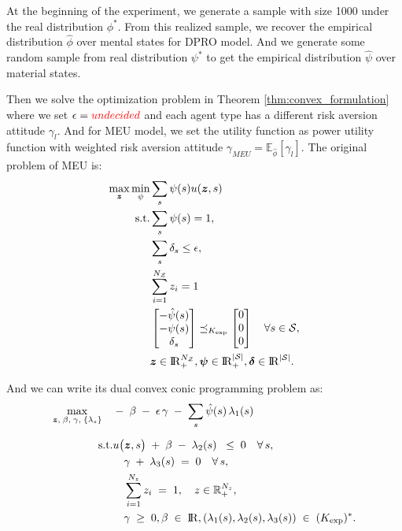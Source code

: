 \documentclass[11pt,oneside]{article}
\theoremstyle{plain}
\theoremstyle{plain}
\theoremstyle{plain}
\theoremstyle{plain}
\theoremstyle{plain}
\theoremstyle{definition}
\theoremstyle{definition}
\theoremstyle{remark}
\theoremstyle{plain}
\newcommand{\R}{{\rm I\!R}}
\def\bbe{{\mathbb{E}}}
\renewcommand{\Re}{\R}
\renewcommand{\Re}{\R}
\newcommand{\mcs}{{\cal S}}
\newcommand{\bb}[1]{{\color{red} #1     }}
\begin{document}
At the beginning of the experiment, we generate a sample with size 1000 under the real distribution $\phi^*$. From this realized sample, we recover the empirical distribution 
$\hat{\phi}$ over mental states for DPRO model. And we generate some random sample from real distribution $\psi^*$ to get the empirical distribution $\hat{\psi}$ over material states.

Then we solve the optimization problem in Theorem \ref{thm:convex_formulation} where we set $\epsilon = \bb{undecided}$ and each agent type has a different risk aversion attitude $\gamma_l$.
And for MEU model, we set the utility function as power utility function with weighted risk aversion attitude $\gamma_{MEU} = \bbe_{\hat{\phi}}[\gamma_l]$. The original problem of MEU is:
\begin{align*}
    \max_{\boldsymbol{z}} \min_{\psi} & \sum_{s} \psi(s) u(\boldsymbol{z},s) \\
    \text{s.t.} & \sum_{s} \psi(s) = 1, \\
    & \sum_{s} \delta_{s} \leq \epsilon, \\
    & \sum_{i=1} ^{N_\mathcal{Z}} z_i =1 \\
    & \begin{bmatrix}
        -\hat{\psi}(s) \\
        -\psi(s) \\
        \delta_{s}
    \end{bmatrix} \preceq_{K_{\text{exp}}} \begin{bmatrix}
        0 \\
        0 \\
        0
    \end{bmatrix} \quad \forall s\in \mcs,\\
    & \boldsymbol{z} \in \R^{N_\mathcal{Z}}_+, \boldsymbol{\psi} \in \R_+^{ |\mcs|}, \boldsymbol{\delta}\in \Re^{ |\mcs|}.
\end{align*}

And we can write its dual convex conic programming problem as:
\begin{align*}
    \max_{\boldsymbol{z},\;\beta,\;\gamma,\;\{\lambda_s\}}\quad &
    -\;\beta\;-\;\epsilon\,\gamma
    \;-\;\sum_{s}\hat{\psi}(s)\,\lambda_{1}(s)
    \\[6pt]
    \text{s.t.} & u\bigl(\boldsymbol{z},s\bigr)\;+\;\beta\;-\;\lambda_{2}(s)\;\;\le\;0
    \quad\forall\,s,\\
    &\quad \gamma\;+\;\lambda_{3}(s)\;=\;0\quad\forall\,s,\\
    &\quad \sum_{i=1}^{N_z} z_i\;=\;1,\quad z \in \mathbb{R}_{+}^{N_z},\\     
    &\quad \gamma \;\ge\; 0, \beta\;\in\;\R ,(\lambda_{1}(s),\lambda_{2}(s),\lambda_{3}(s))\;\in\;(K_{\mathrm{exp}})^{*}.
\end{align*}
\end{document}
